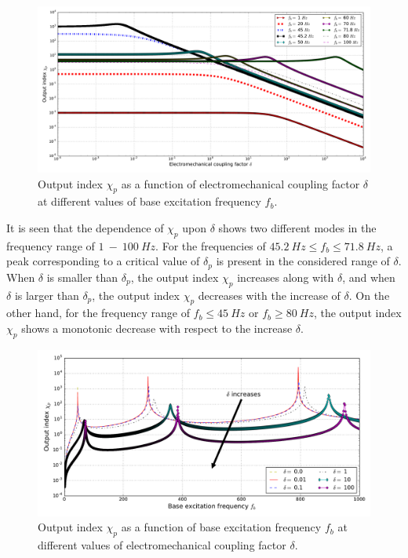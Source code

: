 \documentclass{article}
\begin{document}
\begin{figure}[!htbp]
    \centering
    \includegraphics[width=\textwidth]{./img_eig_asy/fig_sol_analytic_out_index_vs_delta}
    \caption{Output index $\chi_p$ as a function of electromechanical coupling factor $\delta$ at different values of base excitation frequency $f_b$.}
    \label{fig:fig_sol_analytic_out_index_vs_delta}
\end{figure}


It is seen that the dependence of $\chi_p$ upon $\delta$ shows two different modes in the frequency range of $1\ - \ 100\ Hz$. For the frequencies of $45.2\ Hz \leq f_b \leq 71.8\ Hz$, a peak corresponding to a critical value of $\delta_p$ is present in the considered range of $\delta$. When $\delta$ is smaller than $\delta_p$, the output index $\chi_p$ increases along with $\delta$, and when $\delta$ is larger than $\delta_p$, the output index $\chi_p$ decreases with the increase of $\delta$. On the other hand, for the frequency range of $f_b \leq 45\ Hz$ or $f_b \geq 80\ Hz$, the output index $\chi_p$ shows a monotonic decrease with respect to the increase $\delta$.


\begin{figure}[!htbp]
    \centering
    \includegraphics[width=\textwidth]{./img_eig_asy/fig_sol_analytic_out_index_vs_fr}
    \caption{Output index $\chi_p$ as a function of base excitation frequency $f_b$ at different values of electromechanical coupling factor $\delta$.}
    \label{fig:fig_sol_analytic_out_index_vs_fr}
\end{figure}
\end{document}
